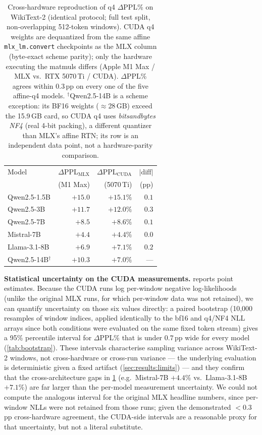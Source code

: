 \documentclass[10pt,twocolumn]{article}
\newcommand{\XEDP}{$+15.1\%$}     %
\newcommand{\XTDP}{$+12.0\%$}     %
\newcommand{\XSDP}{$+8.6\%$}      %
\newcommand{\XMDP}{$+4.4\%$}      %
\newcommand{\XLDP}{$+7.1\%$}      %
\newcommand{\XXDP}{$+7.0\%$}      %
\begin{document}
\begin{table}[t]
  \centering
  \caption{Cross-hardware reproduction of q4 $\Delta$PPL\% on WikiText-2
    (identical protocol; full test split, non-overlapping 512-token windows).
    CUDA q4 weights are dequantized from the same affine
    \texttt{mlx\_lm.convert} checkpoints as the MLX column (byte-exact scheme
    parity); only the hardware executing the matmuls differs (Apple M1 Max /
    MLX vs.\ RTX 5070\,Ti / CUDA).  $\Delta$PPL\% agrees within $0.3$\,pp on
    every one of the five affine-q4 models.  $^\dagger$Qwen2.5-14B is a scheme exception: its
    BF16 weights ($\approx$28\,GB) exceed the 15.9\,GB card, so CUDA q4 uses
    \emph{bitsandbytes NF4} (real 4-bit packing), a different quantizer than
    MLX's affine RTN; its row is an independent data point, not a
    hardware-parity comparison.}
  \label{tab:crosshw}
  \begin{tabular}{lrrr}
    \toprule
    Model & $\Delta$PPL$_\text{MLX}$ & $\Delta$PPL$_\text{CUDA}$ & $|\text{diff}|$ \\
          & (M1 Max)                 & (5070\,Ti)                & (pp)            \\
    \midrule
    Qwen2.5-1.5B          & $+15.0$ & \XEDP & $0.1$ \\
    Qwen2.5-3B            & $+11.7$ & \XTDP & $0.3$ \\
    Qwen2.5-7B            & $+8.5$  & \XSDP & $0.1$ \\
    Mistral-7B            & $+4.4$  & \XMDP & $0.0$ \\
    Llama-3.1-8B          & $+6.9$  & \XLDP & $0.2$ \\
    \midrule
    Qwen2.5-14B$^\dagger$ & $+10.3$ & \XXDP & --- \\
    \bottomrule
  \end{tabular}
\end{table}

\textbf{Statistical uncertainty on the CUDA measurements.}  
reports point estimates.  Because the CUDA runs log per-window negative
log-likelihoods (unlike the original MLX runs, for which per-window data was
not retained), we can quantify uncertainty on those six values directly: a
paired bootstrap (10{,}000 resamples of window indices, applied identically
to the bf16 and q4/NF4 NLL arrays since both conditions were evaluated on the
same fixed token stream) gives a 95\% percentile interval for $\Delta$PPL\%
that is under $0.7$\,pp wide for every model (\cref{tab:bootstrap}).  These
intervals characterise sampling variance across WikiText-2 windows, not
cross-hardware or cross-run variance --- the underlying evaluation is
deterministic given a fixed artifact (\cref{sec:results:limits}) --- and they
confirm that the cross-architecture gaps in \cref{tab:crosshw} (e.g.\
Mistral-7B $+4.4\%$ vs.\ Llama-3.1-8B $+7.1\%$) are far larger than the
per-model measurement uncertainty.  We could not compute the analogous
interval for the original MLX headline numbers, since per-window NLLs were
not retained from those runs; given the demonstrated $<0.3$\,pp cross-hardware
agreement, the CUDA-side intervals are a reasonable proxy for that
uncertainty, but not a literal substitute.
\end{document}
